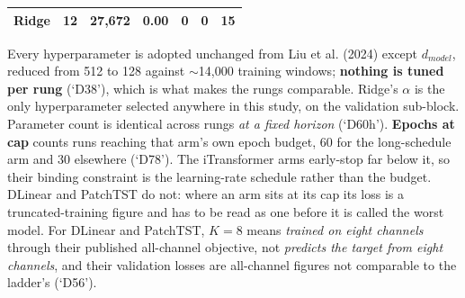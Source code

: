\begin{table}[!t]
\begin{tabular}{lrrrrrr}
Ridge & 12 & 27,672 & 0.00 & 0 & 0 & 15 \\
\bottomrule
\end{tabular}
\vspace{2pt}\par\footnotesize Every hyperparameter is adopted unchanged from Liu et al. (2024) except $d_{model}$, reduced from 512 to 128 against $\sim$14{,}000 training windows; \textbf{nothing is tuned per rung} (`D38'), which is what makes the rungs comparable. Ridge's $\alpha$ is the only hyperparameter selected anywhere in this study, on the validation sub-block. Parameter count is identical across rungs \emph{at a fixed horizon} (`D60h'). \textbf{Epochs at cap} counts runs reaching that arm's own epoch budget, 60 for the long-schedule arm and 30 elsewhere (`D78'). The iTransformer arms early-stop far below it, so their binding constraint is the learning-rate schedule rather than the budget. DLinear and PatchTST do not: where an arm sits at its cap its loss is a truncated-training figure and has to be read as one before it is called the worst model. For DLinear and PatchTST, $K=8$ means \emph{trained on eight channels} through their published all-channel objective, not \emph{predicts the target from eight channels}, and their validation losses are all-channel figures not comparable to the ladder's (`D56').
\end{table}
